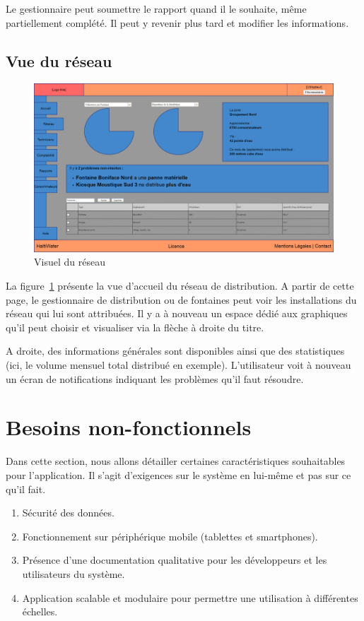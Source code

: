 \documentclass[a4paper, 11pt]{article}
\begin{document}
    Le gestionnaire peut soumettre le rapport quand il le souhaite, même partiellement complété. Il peut y revenir plus tard et modifier les informations.

  \subsection{Vue du réseau}
    \begin{figure}[H]
        \includegraphics[width=\textwidth]{Cahier_des_Charges/reseau}
        \caption{Visuel du réseau}
        \label{fig:network}
    \end{figure}
    La figure~\ref{fig:network} présente la vue d'accueil du réseau de distribution. A partir de cette page, le gestionnaire de distribution ou de fontaines peut voir les installations du réseau qui lui sont attribuées. Il y a à nouveau un espace dédié aux graphiques qu'il peut choisir et visualiser via la flèche à droite du titre.

    A droite, des informations générales sont disponibles ainsi que des statistiques (ici, le volume mensuel total distribué en exemple).
    L'utilisateur voit à nouveau un écran de notifications indiquant les problèmes qu'il faut résoudre.

\section{Besoins non-fonctionnels}
Dans cette section, nous allons détailler certaines caractéristiques souhaitables pour l'application. Il s'agit d'exigences sur le système en lui-même et pas sur ce qu'il fait.
\begin{enumerate}
  \item Sécurité des données.
  \item Fonctionnement sur périphérique mobile (tablettes et smartphones).
  \item Présence d'une documentation qualitative pour les développeurs et les utilisateurs du système.
  \item Application scalable et modulaire pour permettre une utilisation à différentes échelles.
\end{enumerate}
\end{document}
